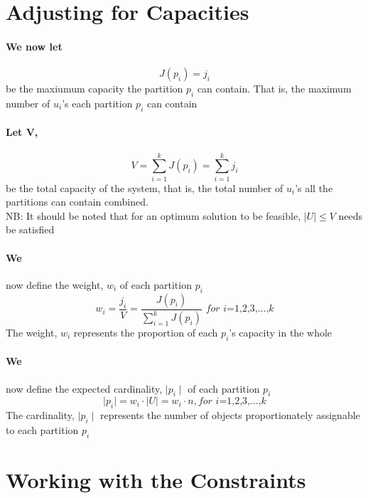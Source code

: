 \documentclass[a4paper,openany]{book}
\begin{document}
		\section{Adjusting for Capacities}
			\paragraph{We now let}
				\begin{equation}
					J(p_i) = j_i
				\end{equation}
				be the maxiumum capacity the partition $p_i$ can contain. That is, the maximum number of $u_i$'s each partition $p_i$ can contain
			\paragraph{Let V,}
				\begin{equation}
					V = \sum_{ i = 1 }^{k}{J(p_i)} = \sum_{i=1}^{k}{j_i}
				\end{equation}
				be the total capacity of the system, that is, the total number of $u_i$'s all the partitions can contain combined.\\
				NB: It should be noted that for an optimum solution to be feasible, $\mid U \mid \leq V$ needs be satisfied
			\paragraph{We}
				now define the weight, $w_i$ of each partition $p_i$
				\begin{equation}
					w_i = \frac{j_i}{V} = \frac{J(p_i)}{\sum_{i=1}^{k}{J(p_i)}}  \textit{ for i=1,2,3,}\dots\text{,}k
				\end{equation}
				The weight, $w_i$ represents the proportion of each $p_i$'s capacity in the whole
			\paragraph{We}
				now define the expected cardinality, $\mid p_i \mid$ of each partition $p_i$
				\begin{equation}
					\mid p_i \mid = w_i \cdot \mid U \mid = w_i \cdot n, \textit{for i=1,2,3,}\dots\text{,}k
				\end{equation}
				The cardinality, $\mid p_i \mid$ represents the number of objects proportionately assignable to each partition $p_i$
		\section{Working with the Constraints}
\end{document}
